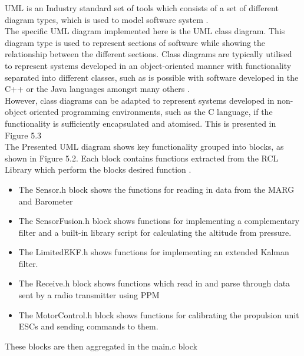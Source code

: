 \documentclass[12pt,a4paper,twoside]{report}
\begin{document}
				UML is an Industry standard set of tools which consists of a set of different diagram types, which is used to model software system \cite{30}.
				\\
				The specific UML diagram implemented here is the UML class diagram. This diagram type is used to represent sections of software while showing the relationship between the different sections. Class diagrams are typically utilised to represent systems developed in an object-oriented manner with functionality separated into different classes, such as is possible with software developed in the C++ or the Java languages amongst many others \cite{30}. 
				\\
				However, class diagrams can be adapted to represent systems developed in non-object oriented programming environments, such as the C language, if the functionality is sufficiently encapsulated and atomised. This is presented in Figure 5.3
				\\
				The Presented UML diagram shows key functionality grouped into blocks, as shown in Figure 5.2. Each block contains functions extracted from the RCL Library which perform the blocks desired function \cite{31}.
				\\
				\begin{itemize}
					
					\item 
						The Sensor.h block shows the functions for reading in data from the MARG and Barometer
					\item 
						The SensorFusion.h block shows functions for implementing a complementary filter and a built-in library script for calculating the altitude from pressure.
					\item
						The LimitedEKF.h shows functions for implementing an extended Kalman filter.
					\item
						The Receive.h block shows functions which read in and parse through data sent by a radio transmitter using PPM
					\item
						The MotorControl.h block shows functions for calibrating the propulsion unit ESCs and sending commands to them.
				\end{itemize}
			
				These blocks are then aggregated in the main.c block
				\\
				
\end{document}
